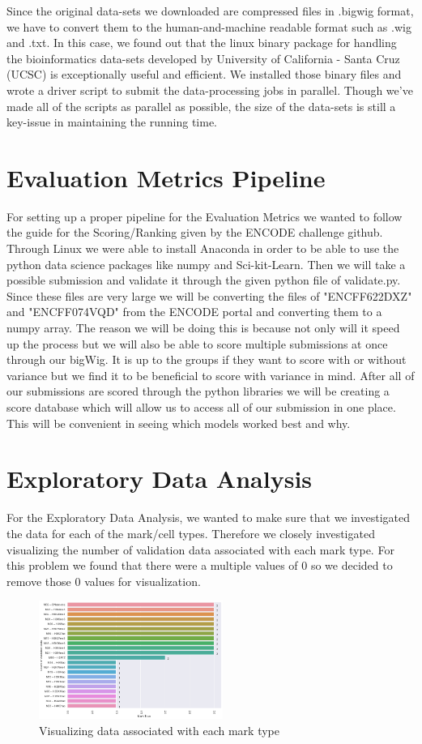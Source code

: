 \documentclass[conference]{IEEEtran}
\begin{document}
Since the original data-sets we downloaded are compressed files in .bigwig format, we have to convert them to the human-and-machine readable format such as .wig and .txt. In this case, we found out that the linux binary package for handling the bioinformatics data-sets developed by University of California - Santa Cruz (UCSC) is exceptionally useful and efficient. We installed those binary files and wrote a driver script to submit the data-processing jobs in parallel. Though we've made all of the scripts as parallel as possible, the size of the data-sets is still a key-issue in maintaining the running time. 

\section{Evaluation Metrics Pipeline}
For setting up a proper pipeline for the Evaluation Metrics we wanted to follow the guide for the Scoring/Ranking given by the ENCODE challenge github. Through Linux we were able to install Anaconda in order to be able to use the python data science packages like numpy and Sci-kit-Learn. Then we will take a possible submission and validate it through the given python file of validate.py. Since these files are very large we will be converting the files of "ENCFF622DXZ" and "ENCFF074VQD" from the ENCODE portal and converting them to a numpy array. The reason we will be doing this is because not only will it speed up the process but we will also be able to score multiple submissions at once through our bigWig. It is up to the groups if they want to score with or without variance but we find it to be beneficial to score with variance in mind. After all of our submissions are scored through the python libraries we will be creating a score database which will allow us to access all of our submission in one place. This will be convenient in seeing which models worked best and why.


\section{Exploratory Data Analysis}
For the Exploratory Data Analysis, we wanted to make sure that we investigated the data for each of the mark/cell types. Therefore we closely investigated visualizing the number of validation data associated with each mark type. For this problem we found that there were a multiple values of 0 so we decided to remove those 0 values for visualization. 
\begin{figure}[htp]
    \centering
    \includegraphics[width=6cm]{output_17_1.png}
    \caption{Visualizing data associated with each mark type}
    \label{fig:Mark Type}
\end{figure}
\end{document}

